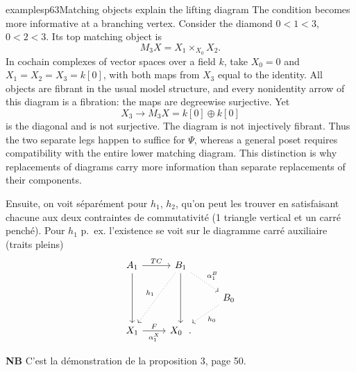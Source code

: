 \begin{dcomment}{examples}{p63}{Matching objects explain the lifting diagram}
The condition becomes more informative at a branching vertex. Consider the diamond $0<1<3$, $0<2<3$. Its top matching object is
\[
                           M_3X=X_1\times_{X_0}X_2.
\]
In cochain complexes of vector spaces over a field $k$, take $X_0=0$ and $X_1=X_2=X_3=k[0]$, with both maps from $X_3$ equal to the identity. All objects are fibrant in the usual model structure, and every nonidentity arrow of this diagram is a fibration: the maps are degreewise surjective. Yet
\[
                  X_3\longrightarrow M_3X=k[0]\oplus k[0]
\]
is the diagonal and is not surjective. The diagram is not injectively fibrant. Thus the two separate legs happen to suffice for $\Psi$, whereas a general poset requires compatibility with the entire lower matching diagram. This distinction is why replacements of diagrams carry more information than separate replacements of their components.
\end{dcomment}


Ensuite, on voit séparément pour $h_1$, $h_2$, qu'on peut les trouver en satisfaisant chacune aux deux contraintes de commutativité (1 triangle vertical et un carré penché). Pour $h_1$ p.~ex. l'existence se voit sur le diagramme carré auxiliaire (traits pleins)
\[
\begin{tikzcd}
A_1 \arrow[r, "TC"] \arrow[dd] & B_1 \arrow[dd] \arrow[ddl, dotted, "h_1"'] \arrow[dr, dotted, "\alpha_1^B"] & \\
 & & B_0 \arrow[dl, dotted, "h_0"] \\
X_1 \arrow[r, "F", "\alpha_1^X"'] & X_0 \ \ . &
\end{tikzcd}
\]

\textbf{NB} C'est la démonstration de la proposition 3, page 50.

